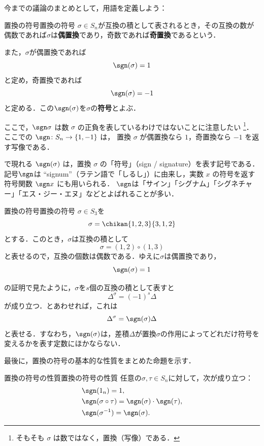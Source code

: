 今までの議論のまとめとして，用語を定義しよう：

\begin{definition}{置換の符号}{置換の符号}
  $\sigma \in S_n$が互換の積として表されるとき，その互換の数が偶数であれば$\sigma$は\textbf{偶置換}であり，奇数であれば\textbf{奇置換}であるという．
  
  また，$\sigma$が偶置換であれば
  \[
  \sgn(\sigma) = 1
  \]
  と定め，奇置換であれば
  \[
  \sgn(\sigma) = -1
  \]
  と定める．この$\sgn(\sigma)$を$\sigma$の\textbf{符号}とよぶ．
\end{definition}


ここで，$\sgn \sigma$ は数 $\sigma$ の正負を表しているわけではないことに注意したい
\footnote{そもそも $\sigma$ は数ではなく，置換（写像）である．}．
ここでの $\sgn \colon S_n \to \{1,-1\}$ は，
置換 $\sigma$ が偶置換なら $1$，奇置換なら $-1$ を返す写像である．



\begin{mycolumn}
  で現れる $\sgn(\sigma)$ は，置換 $\sigma$ の「符号」（sign / signature）を表す記号である．
  記号$\sgn$は ``signum''（ラテン語で「しるし」）に由来し，実数 $x$ の符号を返す符号関数 $\sgn x$ にも用いられる．
  $\sgn$は「サイン」「シグナム」「シグネチャー」「エス・ジー・エヌ」などとよばれることが多い．
\end{mycolumn}

\begin{example}{置換の符号}{置換の符号}
  $\sigma \in S_3$を
  \[
  \sigma = \chikan{1, 2, 3}{3, 1, 2}
  \]
  とする．このとき，$\sigma$は互換の積として
  \[
  \sigma = (1, 2) \circ (1, 3)
  \]
  と表せるので，互換の個数は偶数である．ゆえに$\sigma$は偶置換であり，
  \[
  \sgn(\sigma) = 1
  \]
\end{example}


の証明で見たように，$\sigma$を$s$個の互換の積として表すと
\[
\Delta^\sigma = (-1)^s \Delta
\]
が成り立つ．とあわせれば，これは
\[
\Delta^\sigma = \sgn(\sigma) \Delta
\]
と表せる．すなわち，$\sgn(\sigma)$は，差積$\Delta$が置換$\sigma$の作用によってどれだけ符号を変えるかを表す定数にほかならない．

最後に，置換の符号の基本的な性質をまとめた命題を示す．

\begin{prop}{置換の符号の性質}{置換の符号の性質}
  任意の$\sigma, \tau \in S_n$に対して，次が成り立つ：
  \begin{align*} 
     &\sgn(1_n)  = 1, \\
    &\sgn(\sigma \circ \tau) = \sgn(\sigma) \cdot \sgn(\tau), \\
     &\sgn(\sigma^{-1}) = \sgn(\sigma).
  \end{align*}
\end{prop}


